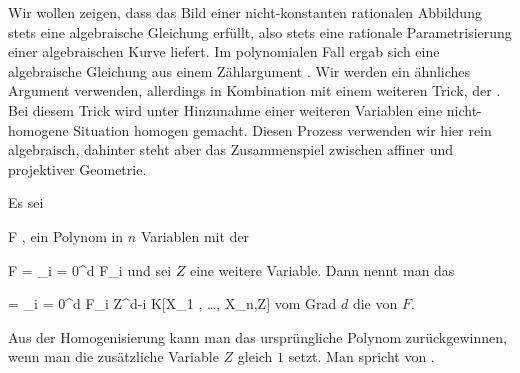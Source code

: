 Wir wollen zeigen, dass das Bild einer nicht-konstanten rationalen Abbildung stets eine algebraische Gleichung erfüllt, also stets eine rationale Parametrisierung einer algebraischen Kurve liefert. Im polynomialen Fall ergab sich eine algebraische Gleichung aus einem Zählargument
 {} {.}
Wir werden ein ähnliches Argument verwenden, allerdings in Kombination mit einem weiteren Trick, der . Bei diesem Trick wird unter Hinzunahme einer weiteren Variablen
 {} {}
eine nicht-homogene Situation homogen gemacht. Diesen Prozess verwenden wir hier rein algebraisch, dahinter steht aber das Zusammenspiel zwischen affiner und projektiver Geometrie.


{}
{





Es sei

 {}
 {F } {}
 {} {} {} {,}
ein Polynom in $n$ Variablen mit der

\mavergleichskettedisp
{\vergleichskette
{ F
}
{ =} { \sum_{i = 0}^d F_i
}
{ } {
}
{ } {
}
{ } {
}
}
{}{}{}
und sei $Z$ eine weitere Variable. Dann nennt man das

\mavergleichskettedisp
{\vergleichskette
{ 
}
{ =} { \sum_{i = 0}^d F_i Z^{d-i}
}
{ \in} { K[X_1 , \ldots , X_n,Z]
}
{ } {
}
{ } {
}
}
{}{}{}
vom Grad $d$ die  von $F$.





}

Aus der Homogenisierung kann man das ursprüngliche Polynom zurückgewinnen, wenn man die zusätzliche Variable $Z$ gleich $1$ setzt. Man spricht von  {.}





